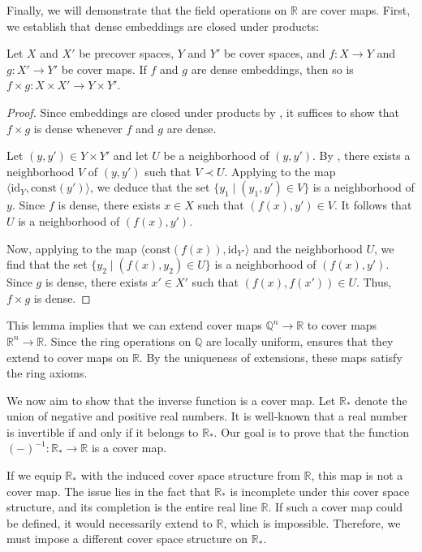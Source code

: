 \documentclass[pdflatex,sn-mathphys-num]{sn-jnl}
\theoremstyle{definition}
\theoremstyle{remark}
\numberwithin{figure}{section}
\newcommand{\rb}{\prec}
\begin{document}
Finally, we will demonstrate that the field operations on $\mathbb{R}$ are cover maps.
First, we establish that dense embeddings are closed under products:

\begin{lem}
Let $X$ and $X'$ be precover spaces, $Y$ and $Y'$ be cover spaces, and $f : X \to Y$ and $g : X' \to Y'$ be cover maps.
If $f$ and $g$ are dense embeddings, then so is $f \times g : X \times X' \to Y \times Y'$.
\end{lem}
\begin{proof}
Since embeddings are closed under products by , it suffices to show that $f \times g$ is dense whenever $f$ and $g$ are dense.

Let $(y,y') \in Y \times Y'$ and let $U$ be a neighborhood of $(y,y')$.
By , there exists a neighborhood $V$ of $(y,y')$ such that $V \rb U$.
Applying  to the map $\langle \mathrm{id}_Y, \mathrm{const}(y') \rangle$, we deduce that the set $\{ y_1 \mid (y_1,y') \in V \}$ is a neighborhood of $y$.
Since $f$ is dense, there exists $x \in X$ such that $(f(x),y') \in V$.
It follows that $U$ is a neighborhood of $(f(x),y')$.

Now, applying  to the map $\langle \mathrm{const}(f(x)), \mathrm{id}_{Y'} \rangle$ and the neighborhood $U$,
we find that the set $\{ y_2 \mid (f(x),y_2) \in U \}$ is a neighborhood of $(f(x),y')$.
Since $g$ is dense, there exists $x' \in X'$ such that $(f(x),f(x')) \in U$.
Thus, $f \times g$ is dense.
\end{proof}

This lemma implies that we can extend cover maps $\mathbb{Q}^n \to \mathbb{R}$ to cover maps $\mathbb{R}^n \to \mathbb{R}$.
Since the ring operations on $\mathbb{Q}$ are locally uniform,  ensures that they extend to cover maps on $\mathbb{R}$.
By the uniqueness of extensions, these maps satisfy the ring axioms.

We now aim to show that the inverse function is a cover map.
Let $\mathbb{R}_*$ denote the union of negative and positive real numbers.
It is well-known that a real number is invertible if and only if it belongs to $\mathbb{R}_*$.
Our goal is to prove that the function $(-)^{-1} : \mathbb{R}_* \to \mathbb{R}$ is a cover map.

If we equip $\mathbb{R}_*$ with the induced cover space structure from $\mathbb{R}$, this map is not a cover map.
The issue lies in the fact that $\mathbb{R}_*$ is incomplete under this cover space structure, and its completion is the entire real line $\mathbb{R}$.
If such a cover map could be defined, it would necessarily extend to $\mathbb{R}$, which is impossible.
Therefore, we must impose a different cover space structure on $\mathbb{R}_*$.
\end{document}
